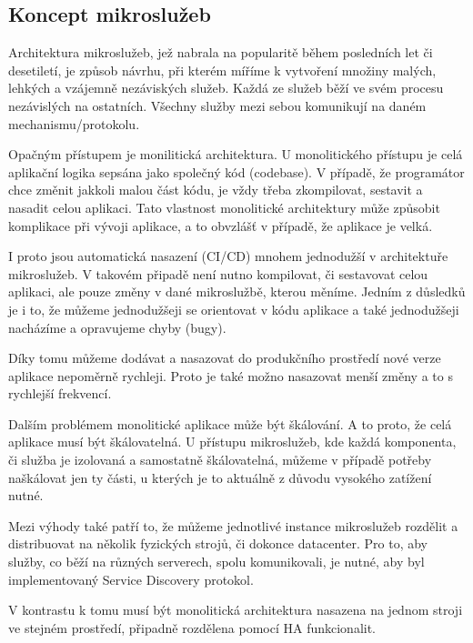 \documentclass[thesis=M,czech]{FITthesis}[2019/12/23]
\theoremstyle{plain}
\theoremstyle{definition}
\begin{document}
\subsection{Koncept mikroslužeb}

Architektura mikroslužeb, jež nabrala na popularitě během posledních let či desetiletí, je způsob návrhu, při kterém míříme k vytvoření množiny malých, lehkých a vzájemně nezáviských služeb. Každá ze služeb běží ve svém procesu nezávislých na ostatních. Všechny služby mezi sebou komunikují na daném mechanismu/protokolu.

Opačným přístupem je monilitická architektura. U monolitického přístupu je celá aplikační logika sepsána jako společný kód (codebase). V případě, že programátor chce změnit jakkoli malou část kódu, je vždy třeba zkompilovat, sestavit a nasadit celou aplikaci. Tato vlastnost monolitické architektury může způsobit komplikace při vývoji aplikace, a to obvzlášť v případě, že aplikace je velká.

I proto jsou automatická nasazení (CI/CD) mnohem jednodužší v architektuře mikroslužeb. V takovém připadě není nutno kompilovat, či sestavovat celou aplikaci, ale pouze změny v dané mikroslužbě, kterou měníme. Jedním z důsledků je i to, že můžeme jednodužšeji se orientovat v kódu aplikace a také jednodužšeji nacházíme a opravujeme chyby (bugy).

Díky tomu můžeme dodávat a nasazovat do produkčního prostředí nové verze aplikace nepoměrně rychleji. Proto je také možno nasazovat menší změny a to s rychlejší frekvencí. 

Dalším problémem monolitické aplikace může být škálování. A to proto, že celá aplikace musí být škálovatelná. U přístupu mikroslužeb, kde každá komponenta, či služba je izolovaná a samostatně škálovatelná, můžeme v případě potřeby naškálovat jen ty části, u kterých je to aktuálně z důvodu vysokého zatížení nutné.

Mezi výhody také patří to, že můžeme jednotlivé instance mikroslužeb rozdělit a distribuovat na několik fyzických strojů, či dokonce datacenter. Pro to, aby služby, co běží na různých serverech, spolu komunikovali, je nutné, aby byl implementovaný Service Discovery protokol. 

V kontrastu k tomu musí být monolitická architektura nasazena na jednom stroji ve stejném prostředí, připadně rozdělena pomocí HA funkcionalit.

\end{document}
